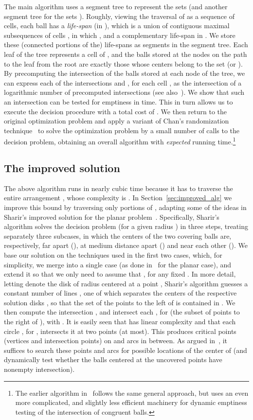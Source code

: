 \documentclass[a4paper,12pt]{article}
\begin{document}
The main algorithm uses a segment tree to represent the sets
 (and another segment tree for the sets ).
Roughly, viewing the traversal of  as a sequence  of
cells, each ball  has a \emph{life-span} (in ),
which is a union of contiguous maximal subsequences of cells ,
in which , and a complementary life-span in
. We store these (connected portions of the) life-spans as
segments in the segment tree. Each leaf of the tree represents a
cell  of , and the balls stored at the nodes on the path
to the leaf from the root are exactly those whose centers belong to
the set  (or ). By precomputing the intersection
of the balls stored at each node of the tree, we can express each of
the intersections  and
, for each cell , as
the intersection of a logarithmic number of precomputed
intersections (see also~\cite{DE}). We show that such an
intersection can be tested for emptiness in  time. This
in turn allows us to execute the decision procedure with a total
cost of . We then return to the original
optimization problem and apply a variant of Chan's randomization
technique~\cite{TCG} to solve the optimization problem by a small
number of calls to the decision problem, obtaining an overall
algorithm with  \emph{expected} running
time.\footnote{\small The earlier algorithm in~\cite{AES} follows
the same general approach, but uses an even more complicated, and
slightly less efficient machinery for dynamic emptiness testing of
the intersection of congruent balls.}

\subsection{The improved solution}
\label{subsec:n^2_sketch} The above algorithm runs in nearly cubic
time because it has to traverse the entire arrangement , whose
complexity is . In Section~\ref{sec:improved_alg} we improve
this bound by traversing only portions of , adapting some of the
ideas in Sharir's improved solution for the planar
problem~\cite{MS}. Specifically, Sharir's algorithm solves the
decision problem (for a given radius ) in three steps, treating
separately three subcases, in which the centers  of the
two covering balls are, respectively, far apart (),
at medium distance apart () and near each
other (). We base our solution on the techniques
used in the first two cases, which, for simplicity, we merge into a
single case (as done in~\cite{DEF} for the planar case), and extend
it so that we only need to assume that , for
any fixed . In more detail, letting  denote the
disk of radius  centered at a point , Sharir's algorithm
guesses a constant number of lines , one of which separates the
centers  of the respective solution disks , so
that the set  of the points to the left of  is contained in
. We then compute the intersection , and intersect each , for  (the subset of points to the right of ), with
. It is easily seen that  has linear
complexity and that each circle , for ,
intersects it at two points (at most). This produces  critical
points (vertices and intersection points) on  and
 arcs in between. As argued in~\cite{MS}, it suffices to
search these points and arcs for possible locations of the center of
 (and dynamically test whether the balls centered at the
uncovered points have nonempty intersection).
\end{document}
